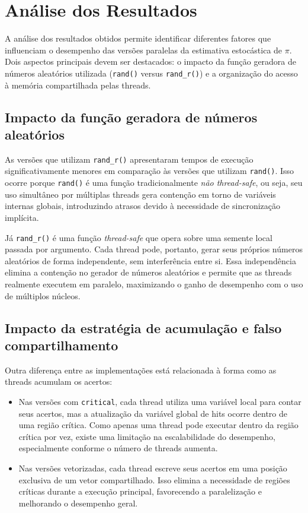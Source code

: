 \documentclass[a4paper, 12pt]{article}
\begin{document}
	\section{Análise dos Resultados}
	
	A análise dos resultados obtidos permite identificar diferentes fatores que influenciam o desempenho das versões paralelas da estimativa estocástica de $\pi$. Dois aspectos principais devem ser destacados: o impacto da função geradora de números aleatórios utilizada (\texttt{rand()} versus \texttt{rand\_r()}) e a organização do acesso à memória compartilhada pelas threads.
	
	\subsection{Impacto da função geradora de números aleatórios}
	
	As versões que utilizam \texttt{rand\_r()} apresentaram tempos de execução significativamente menores em comparação às versões que utilizam \texttt{rand()}. Isso ocorre porque \texttt{rand()} é uma função tradicionalmente \textit{não thread-safe}, ou seja, seu uso simultâneo por múltiplas threads gera contenção em torno de variáveis internas globais, introduzindo atrasos devido à necessidade de sincronização implícita.
	
	Já \texttt{rand\_r()} é uma função \textit{thread-safe} que opera sobre uma semente local passada por argumento. Cada thread pode, portanto, gerar seus próprios números aleatórios de forma independente, sem interferência entre si. Essa independência elimina a contenção no gerador de números aleatórios e permite que as threads realmente executem em paralelo, maximizando o ganho de desempenho com o uso de múltiplos núcleos.
	
	\subsection{Impacto da estratégia de acumulação e falso compartilhamento}
	
	Outra diferença entre as implementações está relacionada à forma como as threads acumulam os acertos:
	
	\begin{itemize}
		\item Nas versões com \texttt{critical}, cada thread utiliza uma variável local para contar seus acertos, mas a atualização da variável global de hits ocorre dentro de uma região crítica. Como apenas uma thread pode executar dentro da região crítica por vez, existe uma limitação na escalabilidade do desempenho, especialmente conforme o número de threads aumenta.
		
		\item Nas versões vetorizadas, cada thread escreve seus acertos em uma posição exclusiva de um vetor compartilhado. Isso elimina a necessidade de regiões críticas durante a execução principal, favorecendo a paralelização e melhorando o desempenho geral.
	\end{itemize}
	
\end{document}

